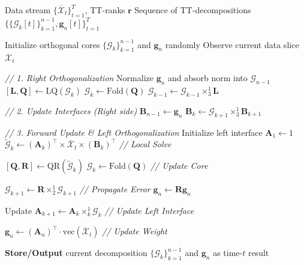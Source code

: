 \documentclass[a4paper, 11pt]{article}
\newcommand{\ttimes}[2]{\times_{#1}^{#2}}
\theoremstyle{plain}
\theoremstyle{definition}
\theoremstyle{remark}
\begin{document}
\begin{algorithm}[!t]
\caption{Online TT-ALS}
\label{alg:online-tt-als}
\begin{algorithmic}[1]
\REQUIRE Data stream $\{\overline{\mathcal{X}}_t\}_{t=1}^T$, TT-ranks $\mathbf{r}$
\ENSURE Sequence of TT-decompositions $\{\{\mathcal{G}_k[t]\}_{k=1}^{n-1}, \bm{g}_n[t]\}_{t=1}^T$

\STATE Initialize orthogonal cores $\{\mathcal{G}_k\}_{k=1}^{n-1}$ and $\bm{g}_n$ randomly
    \STATE Observe current data slice $\overline{\mathcal{X}}_t$
    
    \STATE \textit{// 1. Right Orthogonalization}
    \STATE Normalize $\bm{g}_n$ and absorb norm into $\mathcal{G}_{n-1}$
        \STATE $[\mathbf{L}, \mathbf{Q}] \leftarrow \text{LQ}(\mathcal{G}_k)$
        \STATE $\mathcal{G}_k \leftarrow \text{Fold}(\mathbf{Q})$
        \STATE $\mathcal{G}_{k-1} \leftarrow \mathcal{G}_{k-1} \ttimes{3}{1} \mathbf{L}$
    \ENDFOR

    \STATE \textit{// 2. Update Interfaces (Right side)}
    \STATE $\mathbf{B}_{n-1} \leftarrow \bm{g}_n$
        \STATE $\mathbf{B}_k \leftarrow \mathcal{G}_{k+1} \ttimes{3}{1} \mathbf{B}_{k+1}$
    \ENDFOR

    \STATE \textit{// 3. Forward Update \& Left Orthogonalization}
    \STATE Initialize left interface $\mathbf{A}_{1} \leftarrow 1$
        \STATE $\tilde{\mathcal{G}}_{k} \leftarrow (\mathbf{A}_{k})^\top \times \overline{\mathcal{X}}_t \times (\mathbf{B}_{k})^\top$ \quad \textit{// Local Solve}
        
        \STATE $[\mathbf{Q}, \mathbf{R}] \leftarrow \text{QR}(\tilde{\mathcal{G}}_{k})$
        \STATE $\mathcal{G}_{k} \leftarrow \text{Fold}(\mathbf{Q})$ \quad \textit{// Update Core}
        
            \STATE $\mathcal{G}_{k+1} \leftarrow \mathbf{R} \ttimes{2}{1} \mathcal{G}_{k+1}$ \quad \textit{// Propagate Error}
        \ELSE
            \STATE $\bm{g}_{n} \leftarrow \mathbf{R} \bm{g}_{n}$
        \ENDIF
        
        \STATE Update $\mathbf{A}_{k+1} \leftarrow \mathbf{A}_{k} \ttimes{k}{1} \mathcal{G}_{k}$ \quad \textit{// Update Left Interface}
    \ENDFOR
    
    \STATE $\bm{g}_{n} \leftarrow (\mathbf{A}_{n})^\top \cdot \text{vec}(\overline{\mathcal{X}}_t)$ \quad \textit{// Update Weight}

    \STATE \textbf{Store/Output} current decomposition $\{\mathcal{G}_{k}\}_{k=1}^{n-1}$ and $\bm{g}_{n}$ as time-$t$ result
\ENDFOR
\end{algorithmic}
\end{algorithm}
\end{document}
